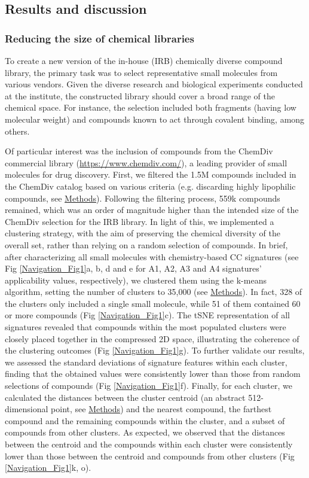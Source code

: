 \subsection{Results and discussion}

\subsubsection{Reducing the size of chemical libraries}

To create a new version of the in-house (IRB) chemically diverse compound library, the primary task was to select representative small molecules from various vendors. Given the diverse research and biological experiments conducted at the institute, the constructed library should cover a broad range of the chemical space. For instance, the selection included both fragments (having low molecular weight) and compounds known to act through covalent binding, among others. 

Of particular interest was the inclusion of compounds from the ChemDiv commercial library (\hyperlink{https://www.chemdiv.com/}{https://www.chemdiv.com/}), a leading provider of small molecules for drug discovery. First, we filtered the 1.5M compounds included in the ChemDiv catalog based on various criteria (e.g. discarding highly lipophilic compounds, see \hyperref[Navigation_Methods]{Methods}). Following the filtering process, 559k compounds remained, which was an order of magnitude higher than the intended size of the ChemDiv selection for the IRB library. In light of this, we implemented a clustering strategy, with the aim of preserving the chemical diversity of the overall set, rather than relying on a random selection of compounds. In brief, after characterizing all small molecules with chemistry-based CC signatures (see Fig \ref{Navigation_Fig1}a, b, d and e for A1, A2, A3 and A4 signatures’ applicability values, respectively), we clustered them using the k-means algorithm, setting the number of clusters to 35,000 (see \hyperref[Navigation_Methods]{Methods}). In fact, 328 of the clusters only included a single small molecule, while 51 of them contained 60 or more compounds (Fig \ref{Navigation_Fig1}c). The tSNE representation of all signatures revealed that compounds within the most populated clusters were closely placed together in the compressed 2D space, illustrating the coherence of the clustering outcomes (Fig \ref{Navigation_Fig1}g). To further validate our results, we assessed the standard deviations of signature features within each cluster, finding that the obtained values were consistently lower than those from random selections of compounds (Fig \ref{Navigation_Fig1}f). Finally, for each cluster, we calculated the distances between the cluster centroid (an abstract 512-dimensional point, see \hyperref[Navigation_Methods]{Methods}) and the nearest compound, the farthest compound and the remaining compounds within the cluster, and a subset of compounds from other clusters. As expected, we observed that the distances between the centroid and the compounds within each cluster were consistently lower than those between the centroid and compounds from other clusters (Fig \ref{Navigation_Fig1}k, o). 

